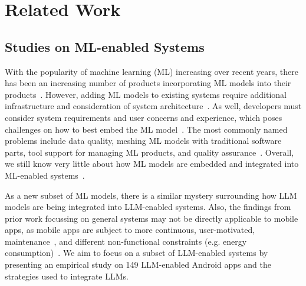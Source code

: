 \section{Related Work}
\label{related-work}

\subsection{Studies on ML-enabled Systems}

With the popularity of machine learning (ML) increasing over recent years, there has been an increasing number of products incorporating ML models into their products~\cite{sens2024large,minaee2024large,zhao2023survey, meyer2023chatgpt, fan2023large, yang2024if}. However, adding ML models to existing systems require additional infrastructure and consideration of system architecture~\cite{paguthaniyaintegration, fan2023large}. As well, developers must consider system requirements and user concerns and experience, which poses challenges on how to best embed the ML model~\cite{sens2024large, nahar2023dataset}. The most commonly named problems include data quality, meshing ML models with traditional software parts, tool support for managing ML products, and quality assurance~\cite{sens2024large, paguthaniyaintegration}. Overall, we still know very little about how ML models are embedded and integrated into ML-enabled systems~\cite{sens2024large}. 

As a new subset of ML models, there is a similar mystery surrounding how LLM models are being integrated into LLM-enabled systems. Also, the findings from prior work focussing on general systems may not be directly applicable to mobile apps, as mobile apps are subject to more continuous, user-motivated, maintenance~\cite{viennot2014measurement}, and different non-functional constraints (e.g. energy consumption)~\cite{palomba2019impact}. We aim to focus on a subset of LLM-enabled systems by presenting an empirical study on 149 LLM-enabled Android apps and the strategies used to integrate LLMs. 




